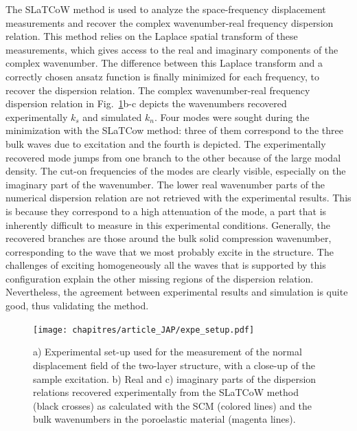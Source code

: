 The SLaTCoW method \cite{geslain2016} is used to analyze the space-frequency displacement measurements and recover the complex wavenumber-real frequency dispersion relation. This method relies on the Laplace spatial transform of these measurements, which gives access to the real and imaginary components of the complex wavenumber. The difference between this Laplace transform and a correctly chosen ansatz function is finally minimized for each frequency, to recover the dispersion relation.  The complex wavenumber-real frequency dispersion relation in Fig.~\ref{fig:expe}b-c depicts the wavenumbers recovered experimentally $k_s$ and simulated $k_n$. Four modes were sought during the minimization with the SLaTCow method: three of them correspond to the three bulk waves due to excitation and the fourth is depicted. The experimentally recovered mode jumps from one branch to the other because of the large modal density. The cut-on frequencies of the modes are clearly visible, especially on the imaginary part of the wavenumber. The lower real wavenumber parts of the numerical dispersion relation are not retrieved with the experimental results. This is because they correspond to a high attenuation of the mode, a part that is inherently difficult to measure in this experimental conditions. Generally, the recovered branches are those around the bulk solid compression wavenumber, corresponding to the wave that we most probably excite in the structure. The challenges of exciting homogeneously all the waves that is supported by this configuration explain the other missing regions of the dispersion relation.  Nevertheless, the agreement between experimental results and simulation is quite good, thus validating the method.
\begin{figure}
    \centering
    \texttt{[image: chapitres/article\_JAP/expe\_setup.pdf]}
    \caption{a) Experimental set-up used for the measurement of the normal displacement field of the two-layer structure, with a close-up of the sample excitation. b) Real and c) imaginary parts of the dispersion relations recovered experimentally from the SLaTCoW method (black crosses) as calculated with the SCM (colored lines) and the bulk wavenumbers in the poroelastic material (magenta lines).}
    \label{fig:expe}
    \end{figure}

